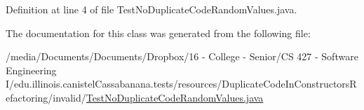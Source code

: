 Definition at line 4 of file TestNoDuplicateCodeRandomValues.java.



The documentation for this class was generated from the following file:\begin{DoxyCompactItemize}
\item 
/media/Documents/Documents/Dropbox/16 -\/ College -\/ Senior/CS 427 -\/ Software Engineering I/edu.illinois.canistelCassabanana.tests/resources/DuplicateCodeInConstructorsRefactoring/invalid/\hyperlink{TestNoDuplicateCodeRandomValues_8java}{TestNoDuplicateCodeRandomValues.java}\end{DoxyCompactItemize}
